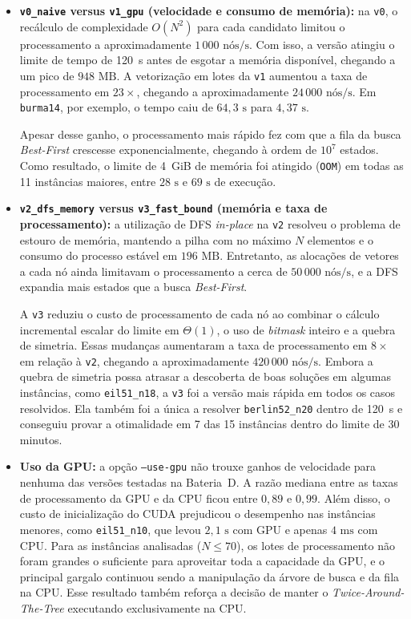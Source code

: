 \begin{itemize}
    \item \textbf{\texttt{v0\_naive} versus \texttt{v1\_gpu} (velocidade e consumo de memória):} na \texttt{v0}, o recálculo de complexidade $O(N^2)$ para cada candidato limitou o processamento a aproximadamente $1\,000\text{ nós/s}$. Com isso, a versão atingiu o limite de tempo de 120~s antes de esgotar a memória disponível, chegando a um pico de $948\text{ MB}$. A vetorização em lotes da \texttt{v1} aumentou a taxa de processamento em $23\times$, chegando a aproximadamente $24\,000\text{ nós/s}$. Em \texttt{burma14}, por exemplo, o tempo caiu de $64{,}3\text{ s}$ para $4{,}37\text{ s}$.

    Apesar desse ganho, o processamento mais rápido fez com que a fila da busca \textit{Best-First} crescesse exponencialmente, chegando à ordem de $10^7$ estados. Como resultado, o limite de 4~GiB de memória foi atingido (\texttt{OOM}) em todas as 11 instâncias maiores, entre $28\text{ s}$ e $69\text{ s}$ de execução.

    \item \textbf{\texttt{v2\_dfs\_memory} versus \texttt{v3\_fast\_bound} (memória e taxa de processamento):} a utilização de DFS \textit{in-place} na \texttt{v2} resolveu o problema de estouro de memória, mantendo a pilha com no máximo $N$ elementos e o consumo do processo estável em $196\text{ MB}$. Entretanto, as alocações de vetores a cada nó ainda limitavam o processamento a cerca de $50\,000\text{ nós/s}$, e a DFS expandia mais estados que a busca \textit{Best-First}.

    A \texttt{v3} reduziu o custo de processamento de cada nó ao combinar o cálculo incremental escalar do limite em $\Theta(1)$, o uso de \textit{bitmask} inteiro e a quebra de simetria. Essas mudanças aumentaram a taxa de processamento em $8\times$ em relação à \texttt{v2}, chegando a aproximadamente $420\,000\text{ nós/s}$. Embora a quebra de simetria possa atrasar a descoberta de boas soluções em algumas instâncias, como \texttt{eil51\_n18}, a \texttt{v3} foi a versão mais rápida em todos os casos resolvidos. Ela também foi a única a resolver \texttt{berlin52\_n20} dentro de 120~s e conseguiu provar a otimalidade em 7 das 15 instâncias dentro do limite de 30 minutos.

    \item \textbf{Uso da GPU:} a opção \texttt{--use-gpu} não trouxe ganhos de velocidade para nenhuma das versões testadas na Bateria~D. A razão mediana entre as taxas de processamento da GPU e da CPU ficou entre $0{,}89$ e $0{,}99$. Além disso, o custo de inicialização do CUDA prejudicou o desempenho nas instâncias menores, como \texttt{eil51\_n10}, que levou $2{,}1\text{ s}$ com GPU e apenas $4\text{ ms}$ com CPU. Para as instâncias analisadas ($N \le 70$), os lotes de processamento não foram grandes o suficiente para aproveitar toda a capacidade da GPU, e o principal gargalo continuou sendo a manipulação da árvore de busca e da fila na CPU. Esse resultado também reforça a decisão de manter o \textit{Twice-Around-The-Tree} executando exclusivamente na CPU.
\end{itemize}

